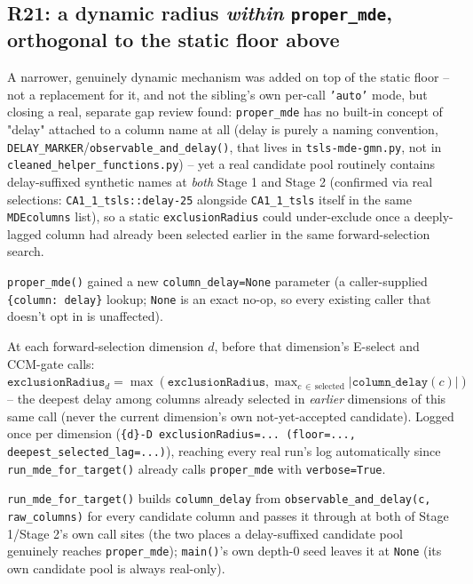 \documentclass[11pt]{article}
\begin{document}
\subsection{R21: a dynamic radius \emph{within} \texttt{proper\_mde}, orthogonal to the static floor above}
\label{sec:exclusion-radius-dynamic}
A narrower, genuinely dynamic mechanism was added on top of the static floor -- not a replacement for it, and not the sibling's own per-call \texttt{'auto'} mode, but closing a real, separate gap review found: \texttt{proper\_mde} has no built-in concept of "delay" attached to a column name at all (delay is purely a naming convention, \texttt{DELAY\_MARKER}/\texttt{observable\_and\_delay()}, that lives in \texttt{tsls-mde-gmn.py}, not in \texttt{cleaned\_helper\_functions.py}) -- yet a real candidate pool routinely contains delay-suffixed synthetic names at \emph{both} Stage 1 and Stage 2 (confirmed via real selections: \texttt{CA1\_1\_tsls::delay-25} alongside \texttt{CA1\_1\_tsls} itself in the same \texttt{MDEcolumns} list), so a static \texttt{exclusionRadius} could under-exclude once a deeply-lagged column had already been selected earlier in the same forward-selection search.
\begin{steps}
\item \texttt{proper\_mde()} gained a new \texttt{column\_delay=None} parameter (a caller-supplied \texttt{\{column: delay\}} lookup; \texttt{None} is an exact no-op, so every existing caller that doesn't opt in is unaffected).
\item At each forward-selection dimension $d$, before that dimension's E-select and CCM-gate calls: $\texttt{exclusionRadius}_d = \max(\texttt{exclusionRadius}, \max_{c \,\in\, \mathrm{selected}} |\texttt{column\_delay}(c)|)$ -- the deepest delay among columns already selected in \emph{earlier} dimensions of this same call (never the current dimension's own not-yet-accepted candidate). Logged once per dimension (\texttt{\{d\}-D exclusionRadius=... (floor=..., deepest\_selected\_lag=...)}), reaching every real run's log automatically since \texttt{run\_mde\_for\_target()} already calls \texttt{proper\_mde} with \texttt{verbose=True}.
\item \texttt{run\_mde\_for\_target()} builds \texttt{column\_delay} from \texttt{observable\_and\_delay(c, raw\_columns)} for every candidate column and passes it through at both of Stage 1/Stage 2's own call sites (the two places a delay-suffixed candidate pool genuinely reaches \texttt{proper\_mde}); \texttt{main()}'s own depth-0 seed leaves it at \texttt{None} (its own candidate pool is always real-only).
\end{steps}
\end{document}
